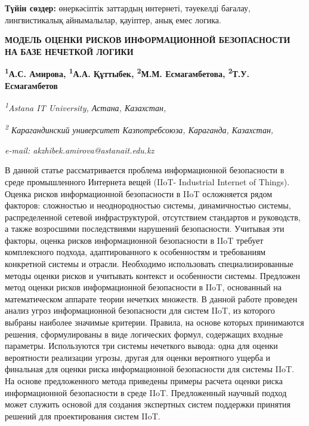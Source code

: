 {\bfseries Түйін сөздер:} өнеркәсіптік заттардың интернеті, тәуекелді
бағалау, лингвистикалық айнымалылар, қауіптер, анық емес логика.

\begin{articleheader}
{\bfseries МОДЕЛЬ ОЦЕНКИ РИСКОВ ИНФОРМАЦИОННОЙ БЕЗОПАСНОСТИ НА БАЗЕ НЕЧЕТКОЙ ЛОГИКИ}

{\bfseries
\textsuperscript{1}А.С. Амирова\textsuperscript{\envelope },
\textsuperscript{1}А.А. Құттыбек,
\textsuperscript{2}М.М. Есмагамбетова,
\textsuperscript{2}Т.У. Есмагамбетов}
\end{articleheader}

\begin{affiliation}
\emph{\textsuperscript{1}Astana IT University, Астана, Казахстан,}

\emph{\textsuperscript{2} Карагандинский университет Казпотребсоюза, Караганда, Казахстан,}

{\em e-mail: akzhibek.amirova@astanait.edu.kz}
\end{affiliation}

В данной статье рассматривается проблема информационной безопасности в
среде промышленного Интернета вещей (IIoT- Industrial Internet of
Things). Оценка рисков информационной безопасности в IIoT осложняется
рядом факторов: сложностью и неоднородностью системы, динамичностью
системы, распределенной сетевой инфраструктурой, отсутствием стандартов
и руководств, а также возросшими последствиями нарушений безопасности.
Учитывая эти факторы, оценка рисков информационной безопасности в IIoT
требует комплексного подхода, адаптированного к особенностям и
требованиям конкретной системы и отрасли. Необходимо использовать
специализированные методы оценки рисков и учитывать контекст и
особенности системы. Предложен метод оценки рисков информационной
безопасности в IIoT, основанный на математическом аппарате теории
нечетких множеств. В данной работе проведен анализ угроз информационной
безопасности для систем IIoT, из которого выбраны наиболее значимые
критерии. Правила, на основе которых принимаются решения, сформулированы
в виде логических формул, содержащих входные параметры. Используются три
системы нечеткого вывода: одна для оценки вероятности реализации угрозы,
другая для оценки вероятного ущерба и финальная для оценки риска
информационной безопасности для системы IIoT. На основе предложенного
метода приведены примеры расчета оценки риска информационной
безопасности в среде IIoT. Предложенный научный подход может служить
основой для создания экспертных систем поддержки принятия решений для
проектирования систем IIoT.

